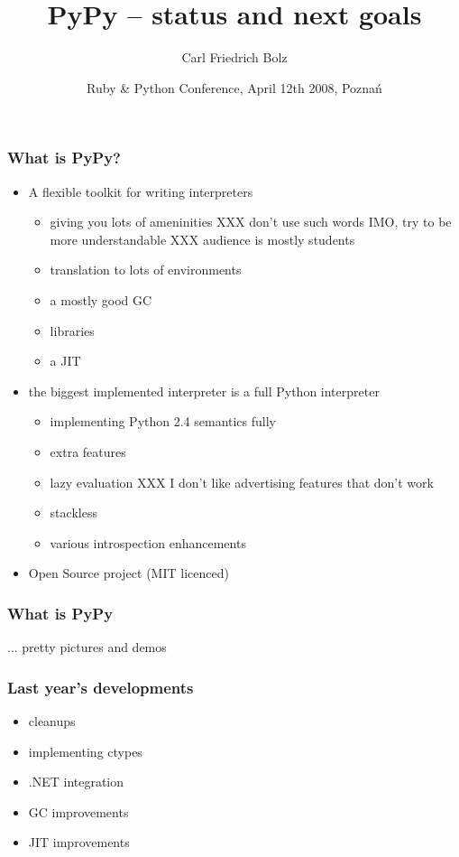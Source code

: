 \documentclass[utf8x]{beamer}
\title{PyPy – status and next goals}
\author{Carl Friedrich Bolz}
\institute[Heinrich-Heine-Universität Düsseldorf]
{
  Institut für Informatik\\
  Heinrich-Heine-Universität Düsseldorf
}
\date{Ruby \& Python Conference, April 12th 2008, Poznań}
\begin{document}
\begin{frame}
  \titlepage
\end{frame}


\begin{frame}
  \frametitle{What is PyPy?}
  \begin{itemize}
  \item
    A flexible toolkit for writing interpreters
    \begin{itemize}
      \item
        giving you lots of ameninities
        XXX don't use such words IMO, try to be more understandable
        XXX audience is mostly students
      \item
        translation to lots of environments
      \item
        a mostly good GC
      \item
        libraries
      \item
        a JIT
    \end{itemize}
  \pause
  \item
    the biggest implemented interpreter is a full Python interpreter
    \begin{itemize}
      \item
        implementing Python 2.4 semantics fully
      \item
        extra features
      \item
        lazy evaluation
        XXX I don't like advertising features that don't work
      \item
        stackless
      \item
        various introspection enhancements
    \end{itemize}
  \item
    Open Source project (MIT licenced)
  \end{itemize}
\end{frame}


\begin{frame}
  \frametitle{What is PyPy}
  ... pretty pictures and demos
\end{frame}




\begin{frame}
  \frametitle{Last year's developments}
  \begin{itemize}
  \item
    cleanups
  \item
    implementing ctypes
  \item
    .NET integration
  \item
    GC improvements
  \item
    JIT improvements
  \end{itemize}
\end{frame}
\end{document}
